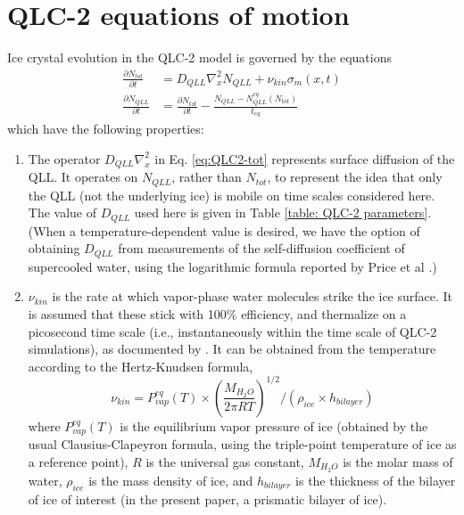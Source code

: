 \documentclass[draft]{agujournal2019}
\begin{document}
\section{QLC-2 equations of motion}
\label{sec:QLC2}
Ice crystal evolution in the QLC-2 model is governed by the equations
\begin{align}
    \frac{\partial N_{tot}}{\partial t} &= D_{QLL}\nabla^2_xN_{QLL} + \nu_{kin}\sigma_m(x,t)
    \label{eq:QLC2-tot}\\
    \frac{\partial N_{QLL}}{\partial t} &= \frac{\partial N_{tot}}{\partial t} - \frac{N_{QLL}-N_{QLL}^{eq}(N_{tot})}{t_{eq}}
    \label{eq:QLC2-qll}
\end{align}
which have the following properties:
\begin{enumerate}
    \item The operator $D_{QLL}\nabla_x^2$ in Eq. \ref{eq:QLC2-tot} represents surface diffusion of the QLL. It operates on $N_{QLL}$, rather than $N_{tot}$, to represent the idea that only the QLL (not the underlying ice) is mobile on time scales considered here. The value of $D_{QLL}$ used here is given in Table \ref{table: QLC-2 parameters}. (When a temperature-dependent value is desired, we have the option of obtaining $D_{QLL}$ from measurements of the self-diffusion coefficient of supercooled water, using the logarithmic formula reported by Price et al \cite{price_self-diffusion_1999}.) 
    
    \item $\nu_{kin}$ is the rate at which vapor-phase water molecules strike the ice surface. It is assumed that these stick with 100\% efficiency, and thermalize on a picosecond time scale (i.e., instantaneously within the time scale of QLC-2 simulations), as documented by \cite{neshyba_molecular_2009}. It can be obtained from the temperature according to the Hertz-Knudsen formula,
    \begin{equation}
        \nu_{kin} = P_{vap}^{eq}(T)\times\left(\frac{M_{H_2O}}{2\pi RT}\right)^{1/2} / (\rho_{ice} \times h_{bilayer})
        \label{eq:nu_kin}
    \end{equation}
    where $P_{vap}^{eq}(T)$ is the equilibrium vapor pressure of ice (obtained by the usual Clausius-Clapeyron formula, using the triple-point temperature of ice as a reference point), $R$ is the universal gas constant, $M_{H_2O}$ is the molar mass of water, $\rho_{ice}$ is the mass density of ice, and $h_{bilayer}$ is the thickness of the bilayer of ice of interest (in the present paper, a prismatic bilayer of ice).
    

\end{enumerate}
\end{document}
